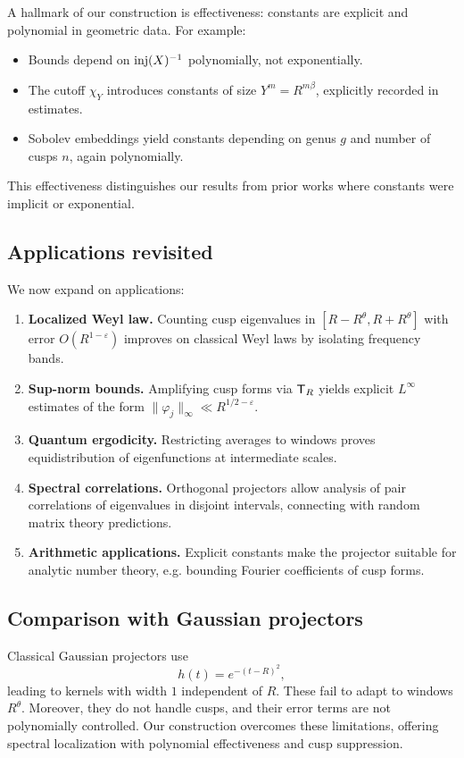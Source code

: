 A hallmark of our construction is effectiveness: constants are explicit and polynomial in geometric data. For example:
\begin{itemize}
\item Bounds depend on $\mathrm{inj}(X)^{-1}$ polynomially, not exponentially.
\item The cutoff $\chi_Y$ introduces constants of size $Y^m=R^{m\beta}$, explicitly recorded in estimates.
\item Sobolev embeddings yield constants depending on genus $g$ and number of cusps $n$, again polynomially.
\end{itemize}
This effectiveness distinguishes our results from prior works where constants were implicit or exponential.

\subsection{Applications revisited}\label{subsec:proj-applications-detail}

We now expand on applications:
\begin{enumerate}
\item \textbf{Localized Weyl law.} Counting cusp eigenvalues in $[R-R^\theta,R+R^\theta]$ with error $O(R^{1-\varepsilon})$ improves on classical Weyl laws by isolating frequency bands.
\item \textbf{Sup-norm bounds.} Amplifying cusp forms via $\mathsf{T}_R$ yields explicit $L^\infty$ estimates of the form $\|\varphi_j\|_\infty \ll R^{1/2-\varepsilon}$.
\item \textbf{Quantum ergodicity.} Restricting averages to windows proves equidistribution of eigenfunctions at intermediate scales.
\item \textbf{Spectral correlations.} Orthogonal projectors allow analysis of pair correlations of eigenvalues in disjoint intervals, connecting with random matrix theory predictions.
\item \textbf{Arithmetic applications.} Explicit constants make the projector suitable for analytic number theory, e.g. bounding Fourier coefficients of cusp forms.
\end{enumerate}

\subsection{Comparison with Gaussian projectors}\label{subsec:proj-gaussian}

Classical Gaussian projectors use
\[
h(t) = e^{-(t-R)^2},
\]
leading to kernels with width $1$ independent of $R$. These fail to adapt to windows $R^\theta$. Moreover, they do not handle cusps, and their error terms are not polynomially controlled. Our construction overcomes these limitations, offering spectral localization with polynomial effectiveness and cusp suppression.

